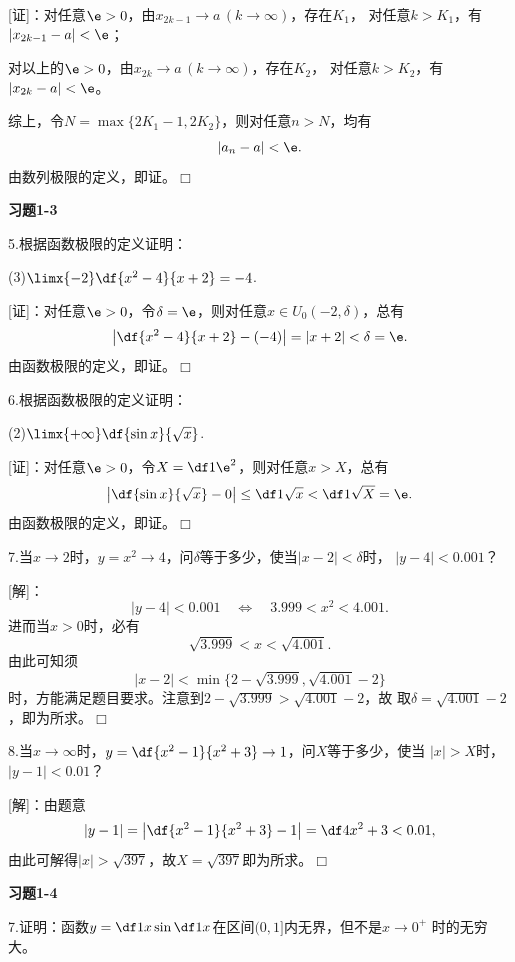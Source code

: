 [证]：对任意$\e>0$，由$x_{2k-1}\to a\,(k\to\infty)$，存在$K_1$，
对任意$k>K_1$，有$|x_{2k-1}-a|<\e$；

对以上的$\e>0$，由$x_{2k}\to a\,(k\to\infty)$，存在$K_2$，
对任意$k>K_2$，有$|x_{2k}-a|<\e$。

综上，令$N=\max\{2K_1-1,2K_2\}$，则对任意$n>N$，均有
$$|a_n-a|<\e.$$
由数列极限的定义，即证。\hfill$\Box$

\bigskip

\begin{center}
	\bf 习题1-3
\end{center}

5.根据函数极限的定义证明：

(3)$\limx{-2}\df{x^2-4}{x+2}=-4$.

[证]：对任意$\e>0$，令$\delta=\e$，则对任意$x\in U_0(-2,\delta)$，总有
$$\left|\df{x^2-4}{x+2}-(-4)\right|=|x+2|<\delta=\e.$$
由函数极限的定义，即证。\hfill$\Box$

\bigskip

6.根据函数极限的定义证明：

(2)$\limx{+\infty}\df{\sin x}{\sqrt x}$.

[证]：对任意$\e>0$，令$X=\df1{\e^2}$，则对任意$x>X$，总有
$$\left|\df{\sin x}{\sqrt x}-0\right|\leq\df1{\sqrt x}
<\df1{\sqrt X}=\e.$$
由函数极限的定义，即证。\hfill$\Box$

\bigskip

7.当$x\to2$时，$y=x^2\to 4$，问$\delta$等于多少，使当$|x-2|<\delta$时，
$|y-4|<0.001$？

[解]：
$$|y-4|<0.001\quad\Leftrightarrow\quad 3.999<x^2<4.001.$$
进而当$x>0$时，必有
$$\sqrt{3.999}<x<\sqrt{4.001}.$$
由此可知须
$$|x-2|<\min\{2-\sqrt{3.999},\sqrt{4.001}-2\}$$
时，方能满足题目要求。注意到$2-\sqrt{3.999}>\sqrt{4.001}-2$，故
取$\delta=\sqrt{4.001}-2$，即为所求。\hfill$\Box$

\bigskip

8.当$x\to\infty$时，$y=\df{x^2-1}{x^2+3}\to1$，问$X$等于多少，使当
$|x|>X$时，$|y-1|<0.01$？

[解]：由题意
$$|y-1|=\left|\df{x^2-1}{x^2+3}-1\right|=\df4{x^2+3}<0.01,$$
由此可解得$|x|>\sqrt{397}$，故$X=\sqrt{397}$即为所求。\hfill$\Box$

\bigskip

\begin{center}
	\bf 习题1-4
\end{center}

7.证明：函数$y=\df1x\sin\df1x$在区间$(0,1]$内无界，但不是$x\to0^+$
时的无穷大。

